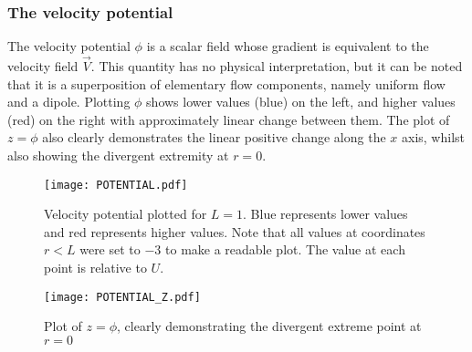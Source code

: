 \subsubsection{The velocity potential}
The velocity potential $\phi$ is a scalar field whose gradient is equivalent to the velocity field $\vec{V}$. This quantity has no
physical interpretation, but it can be noted that it is a superposition of elementary flow components, namely uniform flow and a dipole. Plotting $\phi$ shows lower values (blue) on the left, and higher
values (red) on the right with approximately linear change between them. The plot of $z=\phi$
also clearly demonstrates the linear positive change along the $x$ axis, whilst also showing the divergent extremity at $r=0$.
\begin{figure}
	\centering
	\texttt{[image: POTENTIAL.pdf]}
	\caption{Velocity potential plotted for $L=1$. Blue represents lower values and red represents higher values. Note that all values at coordinates $r<L$ were set to $-3$ to make a readable plot. The value at each point is relative to $U$.}
	\label{figure:VELOCITY-POTENTIAL}
\end{figure}
\begin{figure}
	\centering
	\texttt{[image: POTENTIAL\_Z.pdf]}
	\caption{Plot of $z=\phi$, clearly demonstrating the divergent extreme point at $r=0$}
	\label{figure:VELOCITY-POTENTIAL-3D}
\end{figure}

